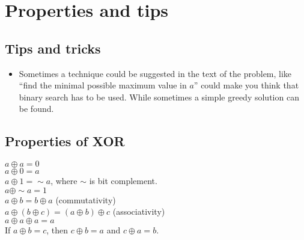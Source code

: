 \chapter{Properties and tips}

\section{Tips and tricks}
\begin{itemize}
    \item Sometimes a technique could be suggested in the text of the problem, like ``find the minimal possible maximum value in $a$'' could make you think that binary search has to be used. While sometimes a simple greedy solution can be found.
\end{itemize}

\section{Properties of XOR}
\begin{flushleft}
$a \oplus a = 0$\\
$a \oplus 0 = a$\\
$a \oplus 1 = \sim a$, where $\sim$ is bit complement.\\
$a \oplus \sim a = 1$\\
$a \oplus b = b \oplus a$ (commutativity)\\
$a \oplus (b \oplus c) = (a \oplus b) \oplus c$ (associativity)\\
$a \oplus a \oplus a = a$\\
If $a \oplus b = c$, then $c \oplus b = a$ and $c \oplus a = b$.
\end{flushleft}


